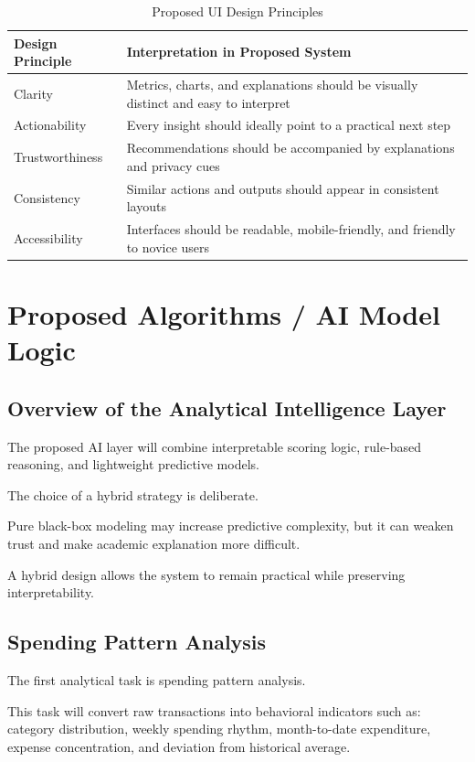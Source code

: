 \documentclass[12pt,a4paper]{report}
\begin{document}
\begin{table}[H]
\centering
\caption{Proposed UI Design Principles}
\label{tab:uidesign}
\begin{tabular}{p{4.2cm}p{9cm}}
\toprule
\textbf{Design Principle} & \textbf{Interpretation in Proposed System} \\
\midrule
Clarity & Metrics,
charts,
and explanations should be visually distinct and easy to interpret \\
Actionability & Every insight should ideally point to a practical next step \\
Trustworthiness & Recommendations should be accompanied by explanations and privacy cues \\
Consistency & Similar actions and outputs should appear in consistent layouts \\
Accessibility & Interfaces should be readable,
mobile-friendly,
and friendly to novice users \\
\bottomrule
\end{tabular}
\end{table}

\chapter{Proposed Algorithms / AI Model Logic}

\section{Overview of the Analytical Intelligence Layer}
The proposed AI layer will combine interpretable scoring logic,
rule-based reasoning,
and lightweight predictive models.

The choice of a hybrid strategy is deliberate.

Pure black-box modeling may increase predictive complexity,
but it can weaken trust and make academic explanation more difficult.

A hybrid design allows the system to remain practical while preserving interpretability.

\section{Spending Pattern Analysis}
The first analytical task is spending pattern analysis.

This task will convert raw transactions into behavioral indicators such as:
category distribution,
weekly spending rhythm,
month-to-date expenditure,
expense concentration,
and deviation from historical average.
\end{document}
